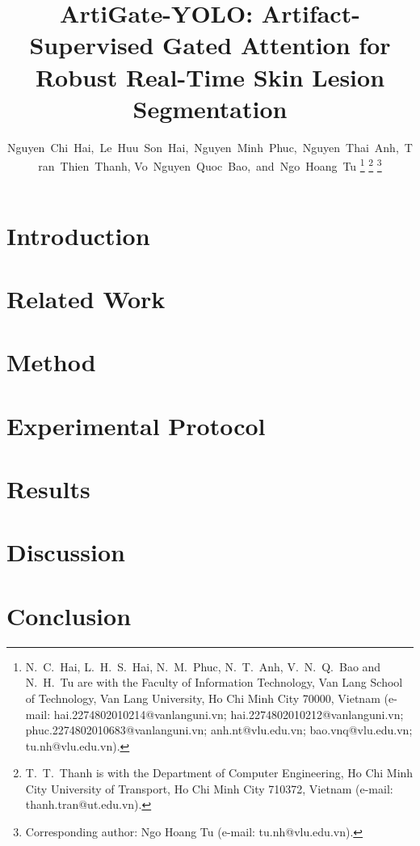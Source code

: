 \documentclass[journal]{IEEEtran}
\begin{document}
\title{ArtiGate-YOLO: Artifact-Supervised Gated Attention for Robust Real-Time Skin Lesion Segmentation}

\author{Nguyen~Chi~Hai,~Le~Huu~Son~Hai,~Nguyen~Minh~Phuc,~Nguyen~Thai~Anh,~Tran~Thien~Thanh,
Vo~Nguyen~Quoc~Bao,~and~Ngo~Hoang~Tu%
\thanks{N.~C.~Hai, L.~H.~S.~Hai, N.~M.~Phuc, N.~T.~Anh, V.~N.~Q.~Bao and N.~H.~Tu are with the Faculty of Information Technology, Van Lang School of Technology, Van Lang University, Ho Chi Minh City 70000, Vietnam (e-mail: hai.2274802010214@vanlanguni.vn; hai.2274802010212@vanlanguni.vn; phuc.2274802010683@vanlanguni.vn; anh.nt@vlu.edu.vn; bao.vnq@vlu.edu.vn; tu.nh@vlu.edu.vn).}%
\thanks{T.~T.~Thanh is with the Department of Computer Engineering, Ho Chi Minh City University of Transport, Ho Chi Minh City 710372, Vietnam (e-mail: thanh.tran@ut.edu.vn).}%
\thanks{Corresponding author: Ngo Hoang Tu (e-mail: tu.nh@vlu.edu.vn).}}


\maketitle



\section{Introduction}\label{sec:intro}


\section{Related Work}\label{sec:related}


\section{Method}\label{sec:method}


\section{Experimental Protocol}\label{sec:protocol}


\section{Results}\label{sec:results}


\section{Discussion}\label{sec:discussion}


\section{Conclusion}\label{sec:conclusion}






\end{document}
